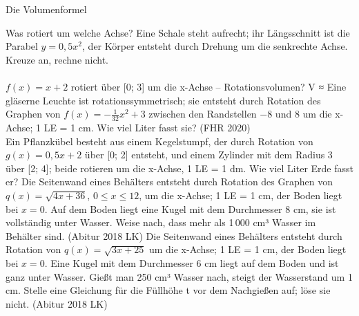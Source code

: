 \setcounter{aufgabe}{7}

\begin{aufgabe}{Die Volumenformel}
\begin{teile}
\teil Was rotiert um welche Achse? Eine Schale steht aufrecht; ihr Längsschnitt ist die Parabel $y = 0{,}5x^2$, der Körper entsteht durch Drehung um die senkrechte Achse. Kreuze an, rechne nicht. \\  \\ 
\teil $f(x) = x + 2$ rotiert über [0; 3] um die x-Achse – Rotationsvolumen? V ≈ \leerfeld
\teil Eine gläserne Leuchte ist rotationssymmetrisch; sie entsteht durch Rotation des Graphen von $f(x) = -\tfrac{1}{32}x^2 + 3$ zwischen den Randstellen −8 und 8 um die x-Achse; 1 LE = 1 cm. Wie viel Liter fasst sie? \hfill (FHR 2020) \\ \leerfeld[l]
\teil Ein Pflanzkübel besteht aus einem Kegelstumpf, der durch Rotation von $g(x) = 0{,}5x + 2$ über [0; 2] entsteht, und einem Zylinder mit dem Radius 3 über [2; 4]; beide rotieren um die x-Achse, 1 LE = 1 dm. Wie viel Liter Erde fasst er? \leerfeld[l]
\teil Die Seitenwand eines Behälters entsteht durch Rotation des Graphen von $q(x) = \sqrt{4x + 36}$, $0 \le x \le 12$, um die x-Achse; 1 LE = 1 cm, der Boden liegt bei $x = 0$. Auf dem Boden liegt eine Kugel mit dem Durchmesser 8 cm, sie ist vollständig unter Wasser. Weise nach, dass mehr als 1\,000 cm³ Wasser im Behälter sind. \hfill (Abitur 2018 LK)
\teil Die Seitenwand eines Behälters entsteht durch Rotation von $q(x) = \sqrt{3x + 25}$ um die x-Achse; 1 LE = 1 cm, der Boden liegt bei $x = 0$. Eine Kugel mit dem Durchmesser 6 cm liegt auf dem Boden und ist ganz unter Wasser. Gießt man 250 cm³ Wasser nach, steigt der Wasserstand um 1 cm. Stelle eine Gleichung für die Füllhöhe t vor dem Nachgießen auf; löse sie nicht. \hfill (Abitur 2018 LK)
\end{teile}
\end{aufgabe}

